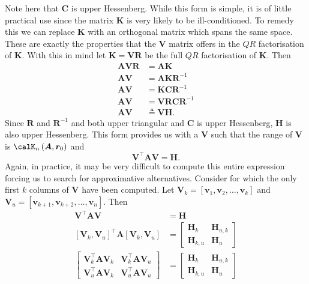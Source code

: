 Note here that $\bm{C}$ is upper Hessenberg. While this form is simple, it is of little practical use since the matrix $\bm{K}$ is very likely to be ill-conditioned. To remedy this we can replace $\bm{K}$ with an orthogonal matrix which spans the same space. These are exactly the properties that the $\bm{V}$ matrix offers in the $QR$ factorisation of $\bm{K}$. With this in mind let $\bm{K} = \bm{V} \bm{R}$ be the full $QR$ factorisation of $\bm{K}$. Then
\begin{align*}
    \bm{A} \bm{V} \bm{R} & = \bm{A} \bm{K}                    \\
    \bm{A} \bm{V}        & = \bm{A} \bm{K} \bm{R}^{-1}        \\
    \bm{A} \bm{V}        & = \bm{K} \bm{C} \bm{R}^{-1}        \\
    \bm{A} \bm{V}        & = \bm{V} \bm{R} \bm{C} \bm{R}^{-1} \\
    \bm{A} \bm{V}        & \triangleq \bm{V} \bm{H}.
\end{align*}
Since $\bm{R}$ and $\bm{R}^{-1}$ and both upper triangular and $\bm{C}$ is upper Hessenberg, $\bm{H}$ is also upper Hessenberg. This form provides us with a $\bm{V}$ such that the range of $\bm{V}$ is $\calK_{n} \left( \bm{A}, \bm{r}_0 \right)$ and
\begin{equation}\label{eq: QTAQ_eq_H}
    \bm{V}^{\intercal} \bm{A} \bm{V} = \bm{H}.
\end{equation}
Again, in practice, it may be very difficult to compute this entire expression forcing us to search for approximative alternatives. Consider  for which the only first $k$ columns of $\bm{V}$ have been computed. Let $\bm{V}_k = \left[ \bm{v}_1 , \bm{v}_2 , \ldots , \bm{v}_k \right]$ and $\bm{V}_u = \left[ \bm{v}_{k+1} , \bm{v}_{k+2} , \ldots , \bm{v}_{n} \right]$. Then
\begin{align*}
    \bm{V}^{\intercal} \bm{A} \bm{V}                                                         & = \bm{H} \\
    \left[ \bm{V}_k , \bm{V}_u \right]^{\intercal} \bm{A} \left[ \bm{V}_k , \bm{V}_u \right] & =
    \begin{bmatrix}
        \bm{H}_k     & \bm{H}_{u,k} \\
        \bm{H}_{k,u} & \bm{H}_{u}
    \end{bmatrix}                                                                           \\
    \begin{bmatrix}
        \bm{V}_{k}^{\intercal} \bm{A} \bm{V}_{k} & \bm{V}_{k}^{\intercal} \bm{A} \bm{V}_{u} \\
        \bm{V}_{u}^{\intercal} \bm{A} \bm{V}_{k} & \bm{V}_{u}^{\intercal} \bm{A} \bm{V}_{u}
    \end{bmatrix}
                                                                                             & =
    \begin{bmatrix}
        \bm{H}_k     & \bm{H}_{u,k} \\
        \bm{H}_{k,u} & \bm{H}_{u}
    \end{bmatrix}
\end{align*}
